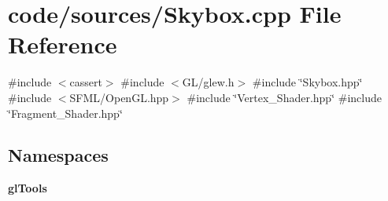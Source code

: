 \section{code/sources/\+Skybox.cpp File Reference}
\label{_skybox_8cpp}
{\ttfamily \#include $<$cassert$>$}\newline
{\ttfamily \#include $<$G\+L/glew.\+h$>$}\newline
{\ttfamily \#include \char`\"{}Skybox.\+hpp\char`\"{}}\newline
{\ttfamily \#include $<$S\+F\+M\+L/\+Open\+G\+L.\+hpp$>$}\newline
{\ttfamily \#include \char`\"{}Vertex\+\_\+\+Shader.\+hpp\char`\"{}}\newline
{\ttfamily \#include \char`\"{}Fragment\+\_\+\+Shader.\+hpp\char`\"{}}\newline
\subsection*{Namespaces}
\begin{DoxyCompactItemize}
\item 
 \textbf{ gl\+Tools}
\end{DoxyCompactItemize}
